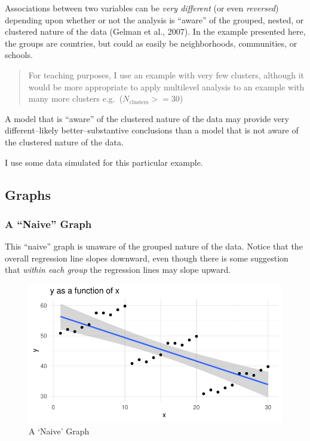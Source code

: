 \documentclass[
  letterpaper,
  DIV=11,
  numbers=noendperiod]{scrreprt}
\begin{document}
Associations between two variables can be \emph{very different} (or even
\emph{reversed}) depending upon whether or not the analysis is ``aware''
of the grouped, nested, or clustered nature of the data (Gelman et al.,
2007). In the example presented here, the groups are countries, but
could as easily be neighborhoods, communities, or schools.

\begin{quote}
For teaching purposes, I use an example with very few clusters, although
it would be more appropriate to apply multilevel analysis to an example
with many more clusters e.g.~(\(N_\text{clusters} >= 30\))
\end{quote}

A model that is ``aware'' of the clustered nature of the data may
provide very different--likely better--substantive conclusions than a
model that is not aware of the clustered nature of the data.

I use some data simulated for this particular example.

\hypertarget{graphs}{%
\subsection{Graphs}\label{graphs}}

\hypertarget{a-naive-graph}{%
\subsubsection{A ``Naive'' Graph}\label{a-naive-graph}}

This ``naive'' graph is unaware of the grouped nature of the data.
Notice that the overall regression line slopes downward, even though
there is some suggestion that \emph{within each group} the regression
lines may slope upward.

\begin{figure}

{\centering \includegraphics{cross-sectional_files/figure-pdf/fig-naive-1.pdf}

}

\caption{\label{fig-naive}A `Naive' Graph}

\end{figure}
\end{document}
